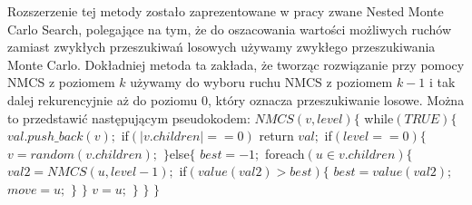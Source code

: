 \documentclass{pracamgr}
\begin{document}
     Rozszerzenie tej metody zostało zaprezentowane w pracy \cite{NMCS} zwane Nested Monte Carlo Search, polegające na tym, że do oszacowania
     wartości możliwych ruchów zamiast zwykłych przeszukiwań losowych używamy zwykłego przeszukiwania Monte Carlo.
     Dokładniej metoda ta zakłada, że tworząc rozwiązanie przy pomocy NMCS z poziomem $k$ używamy do wyboru ruchu NMCS z poziomem $k-1$ i tak dalej rekurencyjnie
     aż do poziomu $0$, który oznacza przeszukiwanie losowe. Można to przedstawić następującym pseudokodem:\newline\newline\newline\newline%
     \hspace*{0pt}$NMCS(v,level)\{$\newline
     \hspace*{16pt}	while$(TRUE)\{$\newline
     \hspace*{32pt}		$val.push\_back(v);$\newline
     \hspace*{32pt}		if$(|v.children|==0)$ return $val;$\newline
     \hspace*{32pt}		if$(level==0)\{$\newline
     \hspace*{48pt}			$v=random(v.children);$\newline
     \hspace*{32pt}		$\}$else$\{$\newline
     \hspace*{48pt}			$best=-1;$\newline    
     \hspace*{48pt}			foreach$(u\in v.children)\{$\newline
     \hspace*{64pt}				$val2=NMCS(u,level-1);$\newline
     \hspace*{64pt}				if$(value(val2)>best)\{$\newline
     \hspace*{80pt}					$best=value(val2);$\newline
     \hspace*{80pt}					$move=u;$\newline
     \hspace*{64pt}				$\}$\newline
     \hspace*{48pt}			$\}$\newline
     \hspace*{48pt}			$v=u;$\newline
     \hspace*{32pt}		$\}$\newline
     \hspace*{16pt}	$\}$\newline
     \hspace*{0pt}$\}$
\end{document}
